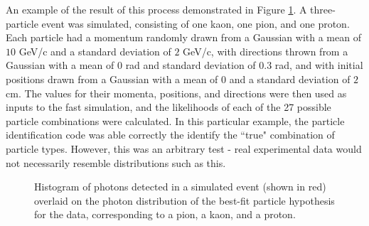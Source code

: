 An example of the result of this process demonstrated in Figure \ref{fig:multiParticle}. A three-particle event was simulated, consisting of one kaon, one pion, and one proton. 
Each particle had a momentum randomly drawn from a Gaussian with a mean of $10$ GeV/c and a standard deviation of $2$ GeV/c, with directions thrown from a Gaussian with a mean of $0$ rad and standard deviation of $0.3$ rad, and with initial positions drawn from a Gaussian with a mean of $0$ and a standard deviation of $2$ cm.
The values for their momenta, positions, and directions were then used as inputs to the fast simulation, and the likelihoods of each of the 27 possible particle combinations were calculated.
In this particular example, the particle identification code was able correctly the identify the ``true" combination of particle types.
However, this was an arbitrary test - real experimental data would not necessarily resemble distributions such as this.

\begin{figure}[]
\centering
{}
\caption[Simulated event data and expected photon distribution for a three-particle event]{Histogram of photons detected in a simulated event (shown in red) overlaid on the photon distribution of the best-fit particle hypothesis for the data, corresponding to a pion, a kaon, and a proton.}
\label{fig:multiParticle} 
\end{figure}


\endinput

Any text after an \endinput is ignored.
You could put scraps here or things in progress.
